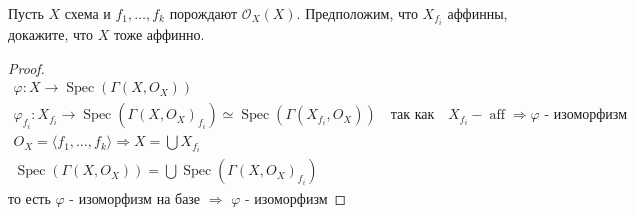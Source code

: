 \begin{prob}
Пусть $X$ схема и $f_1, \ldots, f_k$ порождают $\mathcal{O}_X(X)$. Предположим, что $X_{f_i}$ аффинны, докажите, что $X$ тоже аффинно.
\end{prob}
\begin{proof}
\begin{gather*}
    \varphi: X \to \operatorname{Spec}(\Gamma (X, O_X))\\
    \varphi_{f_i}: X_{f_i} \to \operatorname{Spec}(\Gamma(X, O_X)_{f_i}) \simeq \operatorname{Spec}(\Gamma(X_{f_i}, O_X))
    \quad\text{так как}
    \quad X_{f_i} - \operatorname{aff}
    \Rightarrow \varphi \text{ - изоморфизм}\\
    O_X = \langle f_1, \ldots, f_k \rangle
    \Rightarrow X = \bigcup X_{f_i}\\
    \operatorname{Spec}(\Gamma(X, O_X)) = \bigcup \operatorname{Spec}(\Gamma(X, O_X)_{f_i})
\end{gather*}
то есть $\varphi$ - изоморфизм на базе $\Rightarrow$ $\varphi$ - изоморфизм
\end{proof}
\vskip 0.6in





